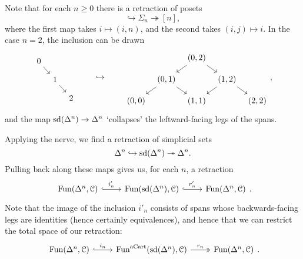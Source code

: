 \documentclass[main.tex]{subfiles}
\begin{document}
\begin{example}
  Note that for each $n \geq 0$ there is a retraction of posets
  \begin{equation*}
    [n] \hookrightarrow \Sigma_{n} \twoheadrightarrow [n],
  \end{equation*}
  where the first map takes $i \mapsto (i, n)$, and the second takes $(i, j) \mapsto i$. In the case $n = 2$, the inclusion can be drawn
  \begin{equation*}
    \begin{tikzcd}[row sep=small, column sep=tiny]
      0
      \arrow[dr]
      \\
      & 1
      \arrow[dr]
      \\
      && 2
    \end{tikzcd}
    \qquad \hookrightarrow \qquad
    \begin{tikzcd}[row sep=small, column sep=tiny]
      && (0, 2)
      \arrow[dl]
      \arrow[dr]
      \\
      & (0, 1)
      \arrow[dl]
      \arrow[dr]
      && (1, 2)
      \arrow[dl]
      \arrow[dr]
      \\
      (0, 0)
      && (1, 1)
      && (2, 2)
    \end{tikzcd},
  \end{equation*}
  and the map $\mathrm{sd}(\Delta^{n}) \to \Delta^{n}$ `collapses' the leftward-facing legs of the spans.

  Applying the nerve, we find a retraction of simplicial sets
  \begin{equation*}
    \Delta^{n} \hookrightarrow \mathrm{sd}(\Delta^{n}) \twoheadrightarrow \Delta^{n}.
  \end{equation*}
  Pulling back along these maps gives us, for each $n$, a retraction
  \begin{equation*}
    \begin{tikzcd}
      \Fun(\Delta^{n}, \category{C}) 
      \arrow[r, hook, "i'_{n}"]
      & \Fun(\sd(\Delta^{n}), \category{C}) 
      \arrow[r, hook, "r'_{n}"]
      & \Fun(\Delta^{n}, \category{C})
    \end{tikzcd}.
  \end{equation*}
  Note that the image of the inclusion $i'_{n}$ consists of spans whose backwards-facing legs are identities (hence certainly equivalences), and hence that we can restrict the total space of our retraction:
  \begin{equation*}
    \begin{tikzcd}
      \Fun(\Delta^{n}, \category{C}) 
      \arrow[r, hook, "i_{n}"]
      & \Fun^{\aCart}(\sd(\Delta^{n}), \category{C}) 
      \arrow[r, two heads, "r_{n}"]
      & \Fun(\Delta^{n}, \category{C})
    \end{tikzcd}.
  \end{equation*}


\end{example}
\end{document}
